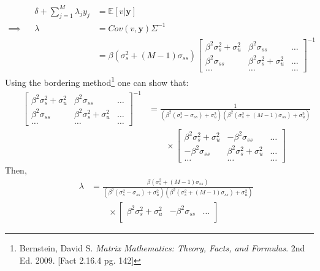 \documentclass{scrartcl}
\newcommand{\rb}[1]{\ensuremath{\left(#1\right)}}
\def\exp{\mathbb{E}}
\begin{document}
\begin{enumerate}
				\begin{align*}
					&& \delta + \sum_{j=1}^M \lambda_j y_j &= \exp [v|\mathbf{y}]\\
					\implies&& \mathbb{\lambda} &= Cov(v,\mathbf{y}) \Sigma^{-1}\\
					&&							&= \beta (\sigma_s^2 + (M-1)\sigma_{ss} ) \begin{bmatrix}
														\beta^2 \sigma_s^2 + \sigma_u^2 & \beta^2 \sigma_{ss} & \ldots\\
														\beta^2 \sigma_{ss} & \beta^2 \sigma_s^2 + \sigma_u^2 & \ldots \\
														\ldots & \ldots & \ldots
													\end{bmatrix}^{-1}
				\end{align*}
				Using the bordering method\footnote{Bernstein, David S. \textit{Matrix Mathematics: Theory, Facts, and Formulas}. 2nd Ed. 2009. [Fact 2.16.4 pg. 142]} one can show that:
				\hspace{-2cm}
				\begin{align*}
					&& \begin{bmatrix} \beta^2 \sigma_s^2 + \sigma_u^2 & \beta^2 \sigma_{ss} & \ldots\\
							\beta^2 \sigma_{ss} & \beta^2 \sigma_s^2 + \sigma_u^2 & \ldots \\
							\ldots & \ldots & \ldots
						\end{bmatrix}^{-1} 	&= \frac{1}{\rb{\beta^2 (\sigma_s^2 - \sigma_{ss}) + \sigma_u^2}\rb{ \beta^2 (\sigma_s^2 + (M-1)\sigma_{ss}) + \sigma_u^2 }}\\
					&&						&	\qquad \times \begin{bmatrix}
															\beta^2 \sigma_s^2 + \sigma_u^2 & - \beta^2 \sigma_{ss} & \ldots\\
															- \beta^2 \sigma_{ss} & \beta^2 \sigma_s^2 + \sigma_u^2 & \ldots \\
															\ldots & \ldots & \ldots
														\end{bmatrix}
				\end{align*}
				Then,
				\begin{align*}
		 					&& \mathbb{\lambda} 	&= \frac{\beta (\sigma_s^2 + (M-1)\sigma_{ss} )}{\rb{\beta^2 (\sigma_s^2 - \sigma_{ss}) + \sigma_u^2}\rb{ \beta^2 (\sigma_s^2 + (M-1)\sigma_{ss}) + \sigma_u^2 }}\\
		 					&&						&	\qquad \times \begin{bmatrix}
																	\beta^2 \sigma_s^2 + \sigma_u^2 & - \beta^2 \sigma_{ss} & \ldots\\

\end{bmatrix}
\end{align*}
\end{enumerate}
\end{document}
